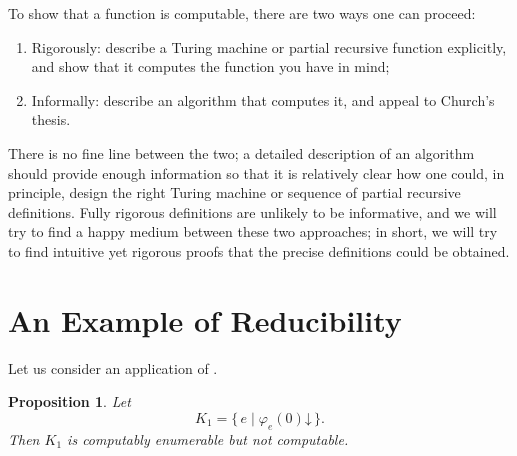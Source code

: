 \documentclass[10pt,a4paper]{article}
\makeatletter
\theoremstyle{plain}
\newtheorem{prop}[thm]{Proposition}
\theoremstyle{definition}
\theoremstyle{remark}
\newcommand*{\olfileid}[3]{}
\newcommand*{\olsection}[1]{\section*{#1}}
\newcommand*{\ollabel}[1]{\label{#1}}
\newcommand{\olref}{\@ifnextchar[{\olref@i}{\olref@final}}
\def\olref@i[#1]{\@ifnextchar[{\olref@ii}{\olref@final}}
\def\olref@ii[#1]{\@ifnextchar[{\olref@iii}{\olref@final}}
\def\olref@iii[#1]{\olref@final}
\def\olref@final#1{\ref{#1}}
\providecommand{\cfind}[1]{\varphi_{#1}}
\providecommand{\fdefined}{\mathord{\downarrow}}
\providecommand{\Setabs}[2]{\{\, #1 \mid #2 \,\}}
\makeatother
\begin{document}
To show that a function is computable, there are
two ways one can proceed:
\begin{enumerate}
\item Rigorously: describe a Turing machine or partial recursive
  function explicitly, and show that it computes the function you have
  in mind;
\item Informally: describe an algorithm that computes it, and appeal to
  Church's thesis.
\end{enumerate}
There is no fine line between the two; a detailed description of
an algorithm should provide enough information so that it is
relatively clear how one could, in principle, design the right Turing
machine or sequence of partial recursive definitions. Fully rigorous
definitions are unlikely to be informative, and we will try to find a
happy medium between these two approaches; in short, we will try to
find intuitive yet rigorous proofs that the precise definitions could
be obtained.





\olfileid{cmp}{thy}{k1}
\olsection{An Example of Reducibility}

Let us consider an application of \olref[ppr]{prop:reduce}.

\begin{prop}
\ollabel{prop:k1}
Let
\[
K_1 = \Setabs{e}{\cfind{e}(0) \fdefined}.
\]
Then $K_1$ is computably enumerable but not computable.
\end{prop}
\end{document}
